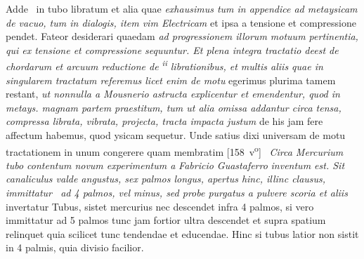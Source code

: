 Adde \mercury\ in tubo libratum et alia quae \textit{exhausimus tum in appendice ad metaysicam de vacuo, tum in dialogis, item vim Electricam } et ipsa a tensione et compressione pendet. Fateor desiderari quaedam \textit{ad progressionem illorum motuum pertinentia, qui ex tensione et compressione sequuntur. Et plena integra tractatio deest de chordarum et arcuum reductione de \mercury\textsuperscript{\textit{ii}} librationibus, et multis aliis quae in singularem tractatum referemus licet enim de motu  } egerimus plurima tamem restant, \textit{ut nonnulla a Mousnerio \protect{}
astructa explicentur et emendentur, quod in metays. magnam partem praestitum, tum ut alia omissa addantur circa tensa, compressa librata, vibrata, projecta, tracta impacta justum } de his jam fere affectum habemus, quod ysicam sequetur. Unde satius dixi universam de motu tractationem in unum congerere quam membratim 
[158~v\textsuperscript{o}]
\pend%
\pstart%
%
%
%
% 
 \,
\textit{Circa Mercurium\protect{} tubo contentum novum experimentum a }\textit{Fabricio Guastaferro}\protect{}\textit{ inventum est. Sit canaliculus valde angustus, sex palmos longus, apertus hinc, illinc clausus, immittatur \mercury\ ad 4 palmos, vel minus, sed probe purgatus a pulvere scoria et aliis } invertatur Tubus, sistet mercurius nec descendet infra 4 palmos, si vero immittatur ad 5 palmos tunc jam fortior  ultra descendet et supra spatium relinquet quia scilicet tunc  tendendae et educendae. Hinc si tubus latior non sistit in 4 palmis, quia divisio facilior.
